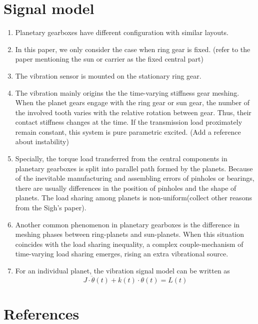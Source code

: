 \documentclass[a4paper,fleqn]{cas-sc}
\begin{document}
\section{Signal model}
\begin{enumerate}[1.]
    \item Planetary gearboxes have different configuration with similar layouts.
    \item In this paper, we only consider the case when ring gear is fixed. (refer to the paper mentioning the sun or carrier as the fixed central part)
    \item The vibration sensor is mounted on the stationary ring gear.
    \item The vibration mainly origins the the time-varying stiffness gear meshing. When the planet gears engage with the ring gear or sun gear, the number of the involved tooth varies with the relative rotation between gear. Thus, their contact stiffness changes at the time. If the transmission load proximately remain constant, this system is pure parametric excited. (Add a reference about instability) 
    \item Specially, the torque load transferred from the central components in planetary gearboxes is split into parallel path formed by the planets. Because of the inevitable manufacturing and assembling errors of pinholes or bearings, there are usually differences in the position of pinholes and the shape of planets. The load sharing among planets is non-uniform(collect other reasons from the Sigh's paper).
    \item Another common phenomenon in planetary gearboxes is the difference in meshing phases between ring-planets and sun-planets. When this situation coincides with the load sharing inequality, a complex couple-mechanism of time-varying load sharing emerges, rising an extra vibrational source.
    \item For an individual planet, the vibration signal model can be written as
    \begin{equation}
        J \cdot \ddot{\theta}(t) + k(t) \cdot \theta(t) = L(t) 
    \end{equation}
    
\end{enumerate}

\section*{References}


\end{document}
